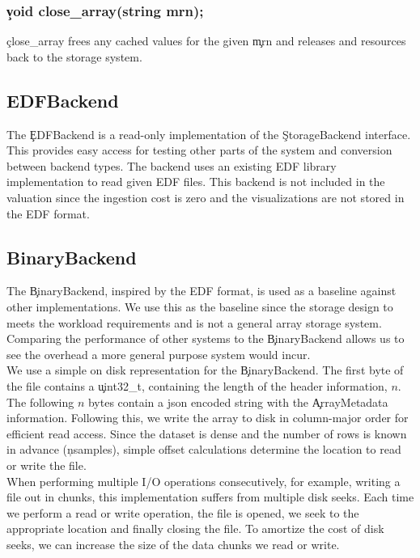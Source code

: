\subsubsection{\c{void close\_array(string mrn);}}
\c{close\_array} frees any cached values for the given \c{mrn} and releases
and resources back to the storage system.

\subsection{EDFBackend}

The \c{EDFBackend} is a read-only implementation of the \c{StorageBackend}
interface. This provides easy access for testing other parts of the system and
conversion between backend types. The backend uses an existing EDF library
implementation \cite{edflib} to read given EDF files. This backend is not
included in the valuation since the ingestion cost is zero and the
visualizations are not stored in the EDF format.

\subsection{BinaryBackend}

The \c{BinaryBackend}, inspired by the EDF format, is used as a baseline
against other implementations. We use this as the baseline since the storage
design to meets the workload requirements and is not a general array storage
system. Comparing the performance of other systems to the \c{BinaryBackend}
allows us to see the overhead a more general purpose system would incur. \\

We use a simple on disk representation for the \c{BinaryBackend}. The first
byte of the file contains a \c{uint32\_t}, containing the length of the header
information, $n$. The following $n$ bytes contain a json encoded string with
the \c{ArrayMetadata} information. Following this, we write the array to disk
in column-major order for efficient read access. Since the dataset is dense and
the number of rows is known in advance (\c{nsamples}), simple offset
calculations determine the location to read or write the file. \\

When performing multiple I/O operations consecutively, for example, writing a
file out in chunks, this implementation suffers from multiple disk seeks. Each
time we perform a read or write operation, the file is opened, we seek to the
appropriate location and finally closing the file. To amortize the cost of disk
seeks, we can increase the size of the data chunks we read or write.

